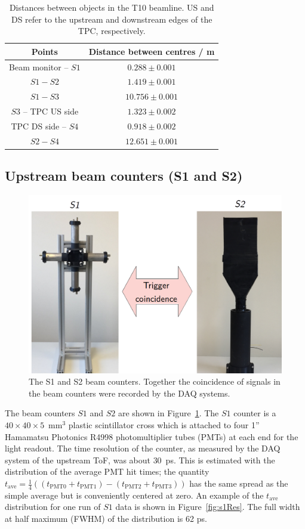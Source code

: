 \begin{table}
  \centering
  \caption{Distances between objects in the T10 beamline. US and DS refer to the upstream and downstream edges of the TPC, respectively.}
  \begin{tabular}{c|c}
    \hline
    \hline
    Points & Distance between centres / m\\
    \hline
    Beam monitor -- $\mathit{S1}$ & $0.288 \pm 0.001$ \\
    $\mathit{S1}-\mathit{S2}$ & $1.419 \pm 0.001$ \\
    $\mathit{S1}-\mathit{S3}$ & $10.756 \pm 0.001$ \\
    $\mathit{S3}$ -- TPC US side & $1.323 \pm 0.002$ \\
    TPC DS side -- $\mathit{S4}$ & $0.918 \pm 0.002$ \\
    $\mathit{S2}-\mathit{S4}$ & $12.651 \pm 0.001$ \\
    \hline    
  \end{tabular}
  \label{tab:distances}
\end{table}

\subsection{Upstream beam counters (S1 and S2)}
\label{subsec:s1s2Exp}
\begin{figure}
  \centering
  \includegraphics[width=0.7\linewidth]{files/Figures/S1S2FrontOn.png}
  \caption{The S1 and S2 beam counters. Together the coincidence of signals in the beam counters were recorded by the DAQ systems.}
  \label{fig:S1S2headon}
\end{figure}
The beam counters $\mathit{S1}$ and $\mathit{S2}$ are shown in Figure~\ref{fig:S1S2headon}.
The $\mathit{S1}$ counter is a $40\times40\times5$~mm$^3$ plastic scintillator cross which is attached to four 1'' Hamamatsu Photonics R4998 photomultiplier tubes (PMTs) at each end for the light readout.
The time resolution of the counter, as measured by the DAQ system of the upstream ToF, was about 30~ps. This is estimated with the distribution of the average PMT hit times; the quantity $t_{\textrm{ave}}=\frac{1}{4}((t_{\textrm{PMT0}}+t_{\textrm{PMT1}})-(t_{\textrm{PMT2}}+t_{\textrm{PMT3}}))$ has the same spread as the simple average but is conveniently centered at zero.
An example of the $t_{\textrm{ave}}$ distribution for one run of $\mathit{S1}$ data is shown in Figure~\ref{fig:s1Res}. The full width at half maximum (FWHM) of the distribution is 62 ps.

